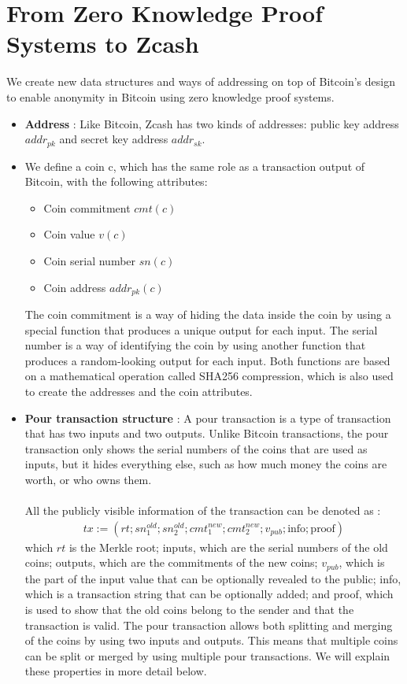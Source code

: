 \section{From Zero Knowledge Proof Systems to Zcash}
We create new data structures and ways of addressing on top of Bitcoin’s design to enable anonymity in Bitcoin using zero knowledge proof systems.
\begin{itemize}
	\item \textbf{Address} :  Like Bitcoin, Zcash has two kinds of addresses: public key address $addr_{pk}$ and secret key address $addr_{sk}$.
	\item We define a coin c, which has the same role as a transaction output of Bitcoin, with the following attributes:
	\begin{itemize}
		\item Coin commitment $cmt(c)$
		\item Coin value $v(c)$
		\item Coin serial number $sn(c)$
		\item Coin address $addr_{pk}(c)$
	\end{itemize}
	The coin commitment is a way of hiding the data inside the coin by using a special function that produces a unique output for each input. The serial number is a way of identifying the coin by using another function that produces a random-looking output for each input. Both functions are based on a mathematical operation called SHA256 compression, which is also used to create the addresses and the coin attributes.
	
	\item \textbf{Pour transaction structure} : A pour transaction is a type of transaction that has two inputs and two outputs. Unlike Bitcoin transactions, the pour transaction only shows the serial numbers of the coins that are used as inputs, but it hides everything else, such as how much money the coins are worth, or who owns them.\\\\
	All the	publicly visible information of the transaction can be denoted as : 
	\begin{align*}
		tx := (rt; sn_1^{old}; sn_2^{old}; cmt_1^{new}; cmt_2^{new}; v_{pub}; \text{info}; \text{proof})
	\end{align*}
	which $rt$ is the Merkle root; inputs, which are the serial numbers of the old coins; outputs, which are the commitments of the new coins; $v_{pub}$, which is the part of the input value that can be optionally revealed to the public; info, which is a transaction string that can be optionally added; and proof, which is used to show that the old coins belong to the sender and that the transaction is valid. The pour transaction allows both splitting and merging of the coins by using two inputs and outputs. This means that multiple coins can be split or merged by using multiple pour transactions. We will explain these properties in more detail below.
\end{itemize}
